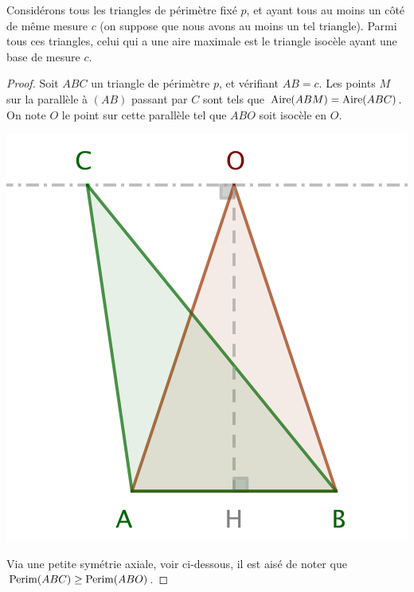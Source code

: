 \begin{fact}\label{iso-tri-one-side-fixed}
	Considérons tous les triangles de périmètre fixé $p$, et ayant tous au moins un côté de même mesure $c$ (on suppose que nous avons au moins un tel triangle).
	Parmi tous ces triangles, celui qui a une aire maximale est le triangle isocèle ayant une base de mesure $c$.
\end{fact}


\begin{proof}
	Soit $ABC$ un triangle de périmètre $p$, et vérifiant $AB = c$. Les points $M$ sur la parallèle à $(AB)$ passant par $C$ sont tels que $\mathrm{Aire}(ABM) = \mathrm{Aire}(ABC)$. On note $O$ le point sur cette parallèle tel que $ABO$ soit isocèle en $O$.

	\begin{center}
		\includegraphics[scale=.4]{content/triangle-one-side-fixed/triangle.png}
	\end{center}

	
	Via une petite symétrie axiale, voir ci-dessous, il est aisé de noter que $\mathrm{Perim}(ABC) \geq \mathrm{Perim}(ABO)$.
	

\end{proof}
